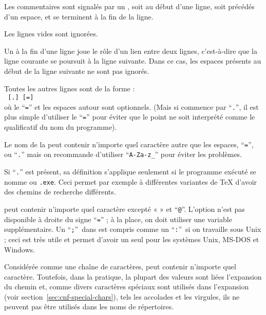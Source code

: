 \documentclass[german, english, french, 12pt]{article}
\renewcommand{\samp}[1]{\enquote{\texttt{#1}}}
\begin{document}
\begin{itemize*}
\item Les commentaires sont signalés par un \code{\%}, soit au début d'une
  ligne, soit précédés d'un espace, et se terminent à la fin de la ligne.
\item Les lignes vides sont ignorées.
\item Un \bs{} à la fin d'une ligne joue le rôle d'un lien entre deux lignes,
  c'est-à-dire que la ligne courante se poursuit à la ligne suivante. Dans ce
  cas, les espaces présents au début de la ligne suivante ne sont pas ignorés.
\item Toutes les autres lignes sont de la forme :\\
  \hspace*{2em}\texttt{ \textrm{[}.\textrm{]}
    \textrm{[}=\textrm{]} }\\[1pt]
  où le \samp{=} et les espaces autour sont optionnels. (Mais si 
  commence par \samp{.}, il est plus simple d'utiliser le \samp{=} pour éviter
  que le point ne soit interprété comme le qualificatif du nom du programme).
\item Le nom de la  peut contenir n'importe quel caractère autre
  que les espaces, \samp{=}, ou \samp{.} mais on recommande d'utiliser
  \samp{A-Za-z\_} pour éviter les problèmes.
\item Si \samp{.} est présent, sa définition s'applique seulement
  si le programme exécuté se nomme \texttt{} ou
  \texttt{.exe}. Ceci permet par exemple à différentes variantes
  de \TeX{} d'avoir des chemins de recherche différents.
\item {} peut contenir n'importe quel caractère excepté « \code{\%} »
  et \samp{@}.  L'option  n'est pas disponible
  à droite du signe \samp{=} ; à la place, on doit utiliser une variable
  supplémentaire. Un \samp{;}\ dans  est compris comme un \samp{:}\
  si on travaille sous Unix ; ceci est très utile et permet d'avoir un seul
  \file{texmf.cnf} pour les systèmes Unix, MS-DOS et Windows.
\item Considérée comme une chaîne de caractères,  peut contenir
  n'importe quel caractère.  Toutefois, dans la pratique, la plupart des valeurs
  \file{texmf.cnf} sont liées l'expansion du chemin et, comme divers caractères
  spéciaux sont utilisés dans l'expansion (voir
  section~\ref{sec:cnf-special-chars}), tels les accolades et les virgules, ils
  ne peuvent pas être utilisés dans les noms de répertoires.


\end{itemize*}
\end{document}
